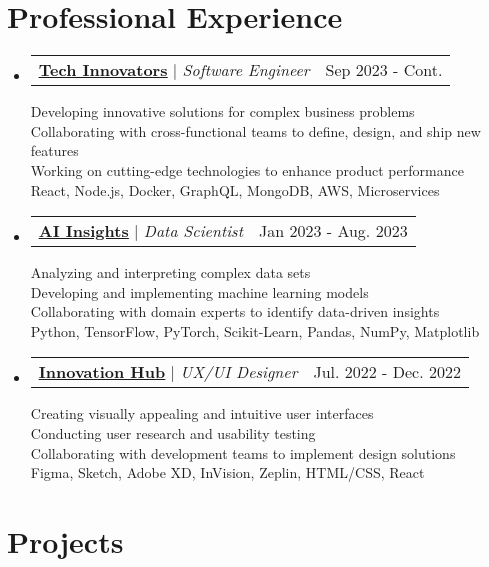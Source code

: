 \documentclass[letterpaper,11pt]{article}%
\makeatletter
\newcommand{\resumeProjectHeading}[2]{
    \item
    \begin{tabular*}{0.97\textwidth}{l@{\extracolsep{\fill}}r}
      \small#1 & #2 \\
    \end{tabular*}\vspace{-7pt}
}
\newcommand{\resumeSubHeadingListStart}{\begin{itemize}[leftmargin=0.15in, label={}]}
\newcommand{\resumeSubHeadingListEnd}{\end{itemize}}
\makeatother
\begin{document}
\section{Professional Experience}%
\label{sec:ProfessionalExperience}%

%
\resumeSubHeadingListStart%
\resumeProjectHeading{\textbf{\href{https://techinnovators.com/}{\underline{Tech Innovators}}} $|$ \footnotesize\emph{Software Engineer}\vspace{8pt}}{Sep 2023 - Cont.}{\small{Developing innovative solutions for complex business problems}}\\
{\small{Collaborating with cross-functional teams to define, design, and ship new features}}\\
{\small{Working on cutting-edge technologies to enhance product performance}}\\
{\small{React, Node.js, Docker, GraphQL, MongoDB, AWS, Microservices}}%
\resumeProjectHeading{\textbf{\href{https://aiinsights.com/}{\underline{AI Insights}}} $|$ \footnotesize\emph{Data Scientist}\vspace{8pt}}{Jan 2023 - Aug. 2023}{\small{Analyzing and interpreting complex data sets}}\\
{\small{Developing and implementing machine learning models}}\\
{\small{Collaborating with domain experts to identify data-driven insights}}\\
{\small{Python, TensorFlow, PyTorch, Scikit-Learn, Pandas, NumPy, Matplotlib}}%
\resumeProjectHeading{\textbf{\href{None}{\underline{Innovation Hub}}} $|$ \footnotesize\emph{UX/UI Designer}\vspace{8pt}}{Jul. 2022 - Dec. 2022}{\small{Creating visually appealing and intuitive user interfaces}}\\
{\small{Conducting user research and usability testing}}\\
{\small{Collaborating with development teams to implement design solutions}}\\
{\small{Figma, Sketch, Adobe XD, InVision, Zeplin, HTML/CSS, React}}%
\resumeSubHeadingListEnd%
\section{Projects}%
\label{sec:Projects}%
\end{document}
